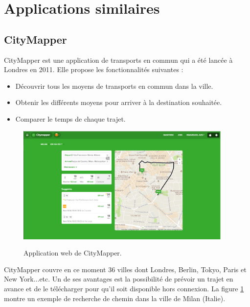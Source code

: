 \section{Applications similaires}			
\subsection{CityMapper}
CityMapper est une application de transports en commun qui a été lancée à Londres en 2011.
Elle propose les fonctionnalités suivantes : 
\begin{itemize}
	\item Découvrir tous les moyens de transports en commun dans la ville.
	\item Obtenir les différents moyens pour arriver à la destination souhaitée.
	\item Comparer le temps de chaque trajet.
\end{itemize}

\begin{figure}[h!]
	\center
	\includegraphics[width=0.95\textwidth]{img/citymapper.png}
	\label{fig:CityMapper}
	\caption{Application web de CityMapper.}
\end{figure}

CityMapper couvre en ce moment 36 villes dont Londres, Berlin, Tokyo, Paris et New York...etc.  Un de ses avantages est la possibilité de prévoir un trajet en avance et de le télécharger pour qu'il soit disponible hors connexion.
La figure \ref{fig:CityMapper} montre un exemple de recherche de chemin dans la ville de Milan (Italie).

